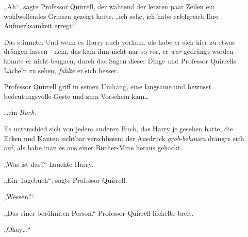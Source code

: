 „Ah“, sagte Professor Quirrell, der während der letzten paar Zeilen ein wohlwollendes Grinsen gezeigt hatte, „ich sehe, ich habe erfolgreich Ihre Aufmerksamkeit erregt.“

Das stimmte. Und wenn es Harry auch vorkam, als habe er sich hier zu etwas drängen lassen—nein, das kam ihm nicht nur so vor, er \emph{war} gedrängt worden—konnte er nicht leugnen, durch das Sagen dieser Dinge und Professor Quirrells Lächeln zu sehen, \emph{fühlte} er sich besser.

Professor Quirrell griff in seinen Umhang, eine langsame und bewusst bedeutungsvolle Geste und zum Vorschein kam…

…ein \emph{Buch}.

Es unterschied sich von jedem anderen Buch, das Harry je gesehen hatte, die Ecken und Kanten sichtbar verschlissen; der Ausdruck \emph{grob-behauen} drängte sich auf, als habe man es aus einer Bücher-Mine heraus gehackt.

„Was ist das?“ hauchte Harry.

„Ein Tagebuch“, sagte Professor Quirrell.

„Wessen?“

„Das einer berühmten Person.“ Professor Quirrell lächelte breit.

„Okay…“

